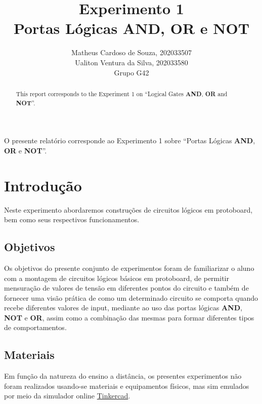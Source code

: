 \documentclass[12pt]{article}
\title{Experimento 1\\
Portas Lógicas AND, OR e NOT}
\author{Matheus Cardoso de Souza, 202033507\\
        Ualiton Ventura da Silva, 202033580\\
        Grupo G42
}
\begin{document}
\maketitle

 \begin{abstract}
   This report corresponds to the Experiment 1 on ``Logical Gates \textbf{AND}, \textbf{OR} and \textbf{NOT}''.
 \end{abstract}

 \begin{resumo}
  O presente relatório corresponde ao Experimento 1 sobre ``Portas Lógicas \textbf{AND}, \textbf{OR} e \textbf{NOT}''.
 \end{resumo}


\section{Introdução}
\label{sec:Introducao}


Neste experimento abordaremos construções de circuitos lógicos em protoboard, bem como seus respectivos funcionamentos.

\subsection{Objetivos}
\label{sec:Objetivos}

Os objetivos do presente conjunto de experimentos foram de familiarizar o aluno
com a montagem de circuitos lógicos básicos em protoboard, de permitir
mensuração de valores de tensão em diferentes pontos do circuito e também de
fornecer uma visão prática de como um determinado circuito se comporta quando
recebe diferentes valores de input, mediante ao uso das portas lógicas
\textbf{AND}, \textbf{NOT} e \textbf{OR}, assim como a combinação das mesmas
para formar diferentes tipos de comportamentos.

\subsection{Materiais}
\label{sec:Materiais}
Em função da natureza do ensino a distância, os presentes experimentos não foram
realizados usando-se materiais e equipamentos físicos, mas sim emulados por meio
da simulador online \href{https://www.tinkercad.com/}{Tinkercad}.
\end{document}
